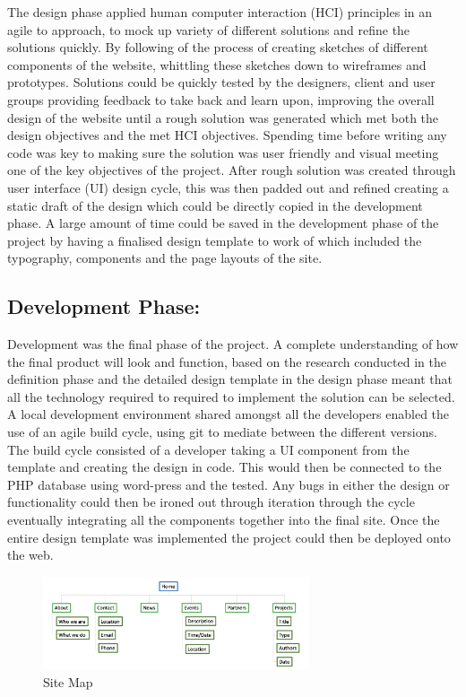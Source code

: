 \documentclass[fontsize=10pt]{extarticle}
\numberwithin{figure}{section} %
\begin{document}
The design phase applied human computer interaction (HCI) principles in
an agile to approach, to mock up variety of different solutions and
refine the solutions quickly. By following of the process of creating
sketches of different components of the website, whittling these
sketches down to wireframes and prototypes. Solutions could be quickly
tested by the designers, client and user groups providing feedback to
take back and learn upon, improving the overall design of the website
until a rough solution was generated which met both the design
objectives and the met HCI objectives. Spending time before writing any
code was key to making sure the solution was user friendly and visual
meeting one of the key objectives of the project. After rough solution
was created through user interface (UI) design cycle, this was then
padded out and refined creating a static draft of the design which could
be directly copied in the development phase. A large amount of time
could be saved in the development phase of the project by having a
finalised design template to work of which included the typography,
components and the page layouts of the site.

\hypertarget{development-phase}{%
\subsection{Development Phase:}\label{development-phase}}

Development was the final phase of the project. A complete understanding
of how the final product will look and function, based on the research
conducted in the definition phase and the detailed design template in
the design phase meant that all the technology required to required to
implement the solution can be selected. A local development environment
shared amongst all the developers enabled the use of an agile build
cycle, using git to mediate between the different versions. The build
cycle consisted of a developer taking a UI component from the template
and creating the design in code. This would then be connected to the PHP
database using word-press and the tested. Any bugs in either the design
or functionality could then be ironed out through iteration through the
cycle eventually integrating all the components together into the final
site. Once the entire design template was implemented the project could
then be deployed onto the web.

\begin{figure}[H]
      \centering
      \includegraphics[trim = 0 0 0 0, clip, width=0.7\textwidth]{ph16.png}
      \caption{Site Map}
      \label{SiteMap}
 \end{figure}
\end{document}
